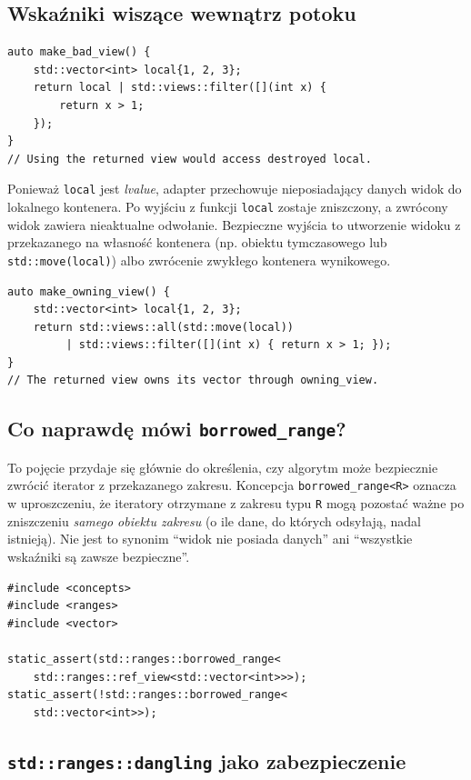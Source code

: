 \subsection{Wskaźniki wiszące wewnątrz potoku}

\begin{lstlisting}
auto make_bad_view() {
    std::vector<int> local{1, 2, 3};
    return local | std::views::filter([](int x) {
        return x > 1;
    });
}
// Using the returned view would access destroyed local.
\end{lstlisting}

Ponieważ \texttt{local} jest \emph{lvalue}, adapter przechowuje
nieposiadający danych widok do lokalnego kontenera. Po wyjściu z
funkcji \texttt{local} zostaje zniszczony, a zwrócony widok zawiera
nieaktualne odwołanie. Bezpieczne wyjścia to utworzenie widoku z
przekazanego na własność kontenera (np. obiektu tymczasowego lub
\texttt{std::move(local)}) albo zwrócenie zwykłego kontenera wynikowego.

\begin{lstlisting}
auto make_owning_view() {
    std::vector<int> local{1, 2, 3};
    return std::views::all(std::move(local))
         | std::views::filter([](int x) { return x > 1; });
}
// The returned view owns its vector through owning_view.
\end{lstlisting}

\subsection{Co naprawdę mówi \texttt{borrowed\_range}?}

To pojęcie przydaje się głównie do określenia, czy algorytm może
bezpiecznie zwrócić iterator z przekazanego zakresu.
Koncepcja \texttt{borrowed\_range<R>} oznacza w uproszczeniu, że
iteratory otrzymane z zakresu typu \texttt{R} mogą pozostać ważne
po zniszczeniu \emph{samego obiektu zakresu} (o ile dane, do których
odsyłają, nadal istnieją). Nie jest to synonim ``widok nie posiada
danych'' ani ``wszystkie wskaźniki są zawsze bezpieczne''.

\begin{lstlisting}
#include <concepts>
#include <ranges>
#include <vector>

static_assert(std::ranges::borrowed_range<
    std::ranges::ref_view<std::vector<int>>>);
static_assert(!std::ranges::borrowed_range<
    std::vector<int>>);
\end{lstlisting}

\subsection{\texttt{std::ranges::dangling} jako zabezpieczenie}

